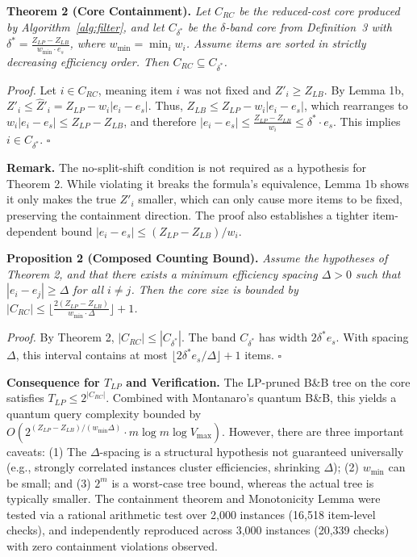 \documentclass[conference]{IEEEtran} \IEEEoverridecommandlockouts
\begin{document}
\textbf{Theorem 2 (Core Containment).} \textit{Let $C_{RC}$ be the reduced-cost core produced by Algorithm~\ref{alg:filter}, and let $C_{\delta^*}$ be the $\delta$-band core from Definition~3 with $\delta^* = \frac{Z_{LP} - Z_{LB}}{w_{\min} \cdot e_s}$, where $w_{\min} = \min_{i} w_i$. Assume items are sorted in strictly decreasing efficiency order. Then $C_{RC} \subseteq C_{\delta^*}$.}

\textit{Proof.} Let $i \in C_{RC}$, meaning item $i$ was not fixed and $Z'_i \ge Z_{LB}$. By Lemma 1b, $Z'_i \le \hat{Z}'_i = Z_{LP} - w_i |e_i - e_s|$. Thus, $Z_{LB} \le Z_{LP} - w_i |e_i - e_s|$, which rearranges to $w_i |e_i - e_s| \le Z_{LP} - Z_{LB}$, and therefore $|e_i - e_s| \le \frac{Z_{LP} - Z_{LB}}{w_i} \le \delta^* \cdot e_s$. This implies $i \in C_{\delta^*}$. $\square$

\textbf{Remark.} The no-split-shift condition is not required as a hypothesis for Theorem 2. While violating it breaks the formula's equivalence, Lemma 1b shows it only makes the true $Z'_i$ smaller, which can only cause more items to be fixed, preserving the containment direction. The proof also establishes a tighter item-dependent bound $|e_i - e_s| \le (Z_{LP} - Z_{LB})/w_i$.

\textbf{Proposition 2 (Composed Counting Bound).} \textit{Assume the hypotheses of Theorem 2, and that there exists a minimum efficiency spacing $\Delta > 0$ such that $|e_i - e_j| \ge \Delta$ for all $i \ne j$. Then the core size is bounded by $|C_{RC}| \le \lfloor \frac{2(Z_{LP} - Z_{LB})}{w_{\min} \cdot \Delta} \rfloor + 1$.}

\textit{Proof.} By Theorem 2, $|C_{RC}| \le |C_{\delta^*}|$. The band $C_{\delta^*}$ has width $2 \delta^* e_s$. With spacing $\Delta$, this interval contains at most $\lfloor 2\delta^* e_s / \Delta \rfloor + 1$ items. $\square$

\textbf{Consequence for $T_{LP}$ and Verification.} The LP-pruned B\&B tree on the core satisfies $T_{LP} \le 2^{|C_{RC}|}$. Combined with Montanaro's quantum B\&B, this yields a quantum query complexity bounded by $O(2^{(Z_{LP} - Z_{LB})/(w_{\min} \Delta)} \cdot m \log m \log V_{\max})$. However, there are three important caveats: (1) The $\Delta$-spacing is a structural hypothesis not guaranteed universally (e.g., strongly correlated instances cluster efficiencies, shrinking $\Delta$); (2) $w_{\min}$ can be small; and (3) $2^m$ is a worst-case tree bound, whereas the actual tree is typically smaller.
The containment theorem and Monotonicity Lemma were tested via a rational arithmetic test over 2,000 instances (16,518 item-level checks), and independently reproduced across 3,000 instances (20,339 checks) with zero containment violations observed.
\end{document}

